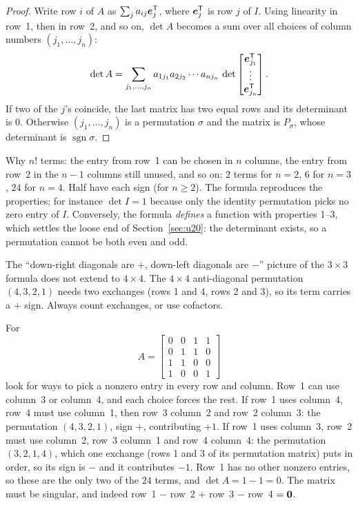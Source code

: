 \begin{proof}
Write row $i$ of $A$ as $\sum_j a_{ij}\boldsymbol{e}_j^{\mathsf{T}}$, where $\boldsymbol{e}_j^{\mathsf{T}}$ is row $j$ of $I$. Using
linearity in row~1, then in row~2, and so on, $\det A$ becomes a sum over all choices of
column numbers $(j_1,\dots,j_n)$:
\[
  \det A=\sum_{j_1,\dots,j_n}a_{1j_1}a_{2j_2}\cdots a_{nj_n}\,
  \det\begin{bmatrix}\boldsymbol{e}_{j_1}^{\mathsf{T}}\\ \vdots\\ \boldsymbol{e}_{j_n}^{\mathsf{T}}\end{bmatrix}.
\]
If two of the $j$'s coincide, the last matrix has two equal rows and its determinant is $0$.
Otherwise $(j_1,\dots,j_n)$ is a permutation $\sigma$ and the matrix is $P_\sigma$, whose
determinant is $\operatorname{sgn}\sigma$.
\end{proof}

Why $n!$ terms: the entry from row~1 can be chosen in $n$ columns, the entry from row~2 in the
$n-1$ columns still unused, and so on: $2$ terms for $n=2$, $6$ for $n=3$, $24$ for $n=4$.
Half have each sign (for $n\ge 2$). The formula reproduces the properties; for instance
$\det I=1$ because only the identity permutation picks no zero entry of $I$. Conversely, the
formula \emph{defines} a function with properties 1--3, which settles the loose end of
Section~\ref{sec:u20}: the determinant exists, so a permutation cannot be both even and odd.

\begin{trap}
The ``down-right diagonals are $+$, down-left diagonals are $-$'' picture of the $3\times 3$
formula does not extend to $4\times 4$. The $4\times 4$ anti-diagonal permutation $(4,3,2,1)$
needs two exchanges (rows 1 and 4, rows 2 and 3), so its term carries a $+$ sign. Always count
exchanges, or use cofactors.
\end{trap}

\begin{example}\label{ex:u21-sparse}
For
\[
  A=\begin{bmatrix}0&0&1&1\\0&1&1&0\\1&1&0&0\\1&0&0&1\end{bmatrix}
\]
look for ways to pick a nonzero entry in every row and column. Row~1 can use column~3 or
column~4, and each choice forces the rest. If row~1 uses column~4, row~4 must use column~1,
then row~3 column~2 and row~2 column~3: the permutation $(4,3,2,1)$, sign $+$, contributing
$+1$. If row~1 uses column~3, row~2 must use column~2, row~3 column~1 and row~4 column~4:
the permutation $(3,2,1,4)$, which one exchange (rows 1 and 3 of its permutation matrix) puts
in order, so its sign is $-$ and it contributes $-1$.
Row~1 has no other nonzero entries, so these are the only two of the $24$ terms, and
$\det A=1-1=0$. The matrix must be singular, and indeed
row~1 $-$ row~2 $+$ row~3 $-$ row~4 $=\boldsymbol{0}$.
\end{example}

